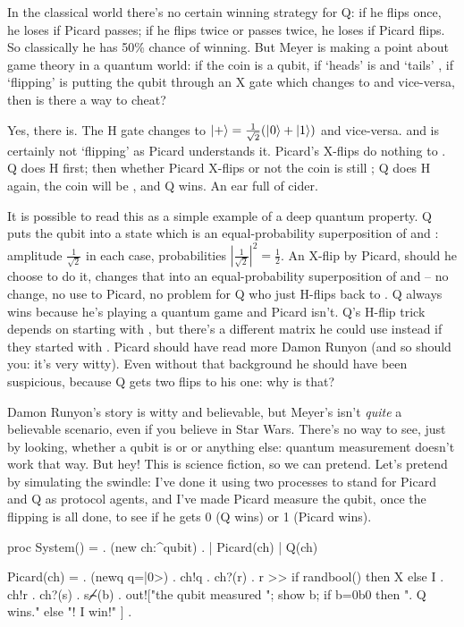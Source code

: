 In the classical world there's no certain winning strategy for Q: if he flips once, he loses if Picard passes; if he flips twice or passes twice, he loses if Picard flips. So classically he has 50\% chance of winning. But Meyer is making a point about game theory in a quantum world: if the coin is a qubit, if `heads' is \zero{} and `tails' \one{}, if `flipping' is putting the qubit through an X gate which changes \zero{} to \one{} and vice-versa, then is there a way to cheat?

Yes, there is. The H gate changes \zero{} to $\plus{}=\frac{1}{\sqrt2}(\zero+\one)$ and vice-versa. and is certainly not `flipping' as Picard understands it. Picard's X-flips do nothing to \plus{}. Q does H first; then whether Picard X-flips or not the coin is still \plus{}; Q does H again, the coin will be \zero{}, and Q wins. An ear full of cider.

It is possible to read this as a simple example of a deep quantum property. Q puts the qubit into a state which is an equal-probability superposition of \zero{} and \one{}: amplitude $\frac{1}{\sqrt2}$ in each case, probabilities $|\frac{1}{\sqrt2}|^{2}=\frac{1}{2}$. An X-flip by Picard, should he choose to do it, changes that into an equal-probability superposition of \one{} and \zero{} -- no change, no use to Picard, no problem for Q who just H-flips back to \zero{}. Q always wins because he's playing a quantum game and Picard isn't. Q's H-flip trick depends on starting with \zero{}, but there's a different matrix he could use instead if they started with \one{}. Picard should have read more Damon Runyon (and so should you: it's very witty). Even without that background he should have been suspicious, because Q gets two flips to his one: why is that?

Damon Runyon's story is witty and believable, but Meyer's isn't \emph{quite} a believable scenario, even if you believe in Star Wars. There's no way to see, just by looking, whether a qubit is \zero{} or \one{} or anything else: quantum measurement doesn't work that way. But hey! This is science fiction, so we can pretend. Let's pretend by simulating the swindle: I've done it using two processes to stand for Picard and Q as protocol agents, and I've made Picard measure the qubit, once the flipping is all done, to see if he gets 0 (Q wins) or 1 (Picard wins).

\mvb {\cointoss}
proc System() = . (new ch:^qubit) 
                . | Picard(ch) | Q(ch)  

     Picard(ch) = . (newq q=|0>) 
                  . ch!q
                  . ch?(r)
                  . r >> if randbool() then X else I
                  . ch!r 
                  . ch?(s)
                  . s⌢̸(b)
                  . out!["the qubit measured "; show b; 
                         if b=0b0 then ". Q wins.\n" else "! I win!\n"
                        ]
                  .

